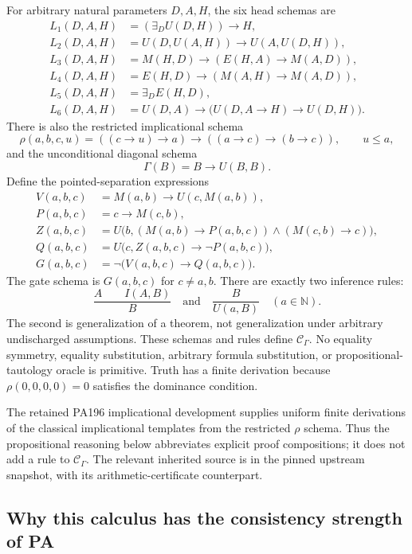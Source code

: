 For arbitrary natural parameters $D,A,H$, the six head schemas are
\begin{align*}
 L_1(D,A,H)&=(\exists_D U(D,H))\to H,\\
 L_2(D,A,H)&=U(D,U(A,H))\to U(A,U(D,H)),\\
 L_3(D,A,H)&=M(H,D)\to(E(H,A)\to M(A,D)),\\
 L_4(D,A,H)&=E(H,D)\to(M(A,H)\to M(A,D)),\\
 L_5(D,A,H)&=\exists_D E(H,D),\\
 L_6(D,A,H)&=U(D,A)\to\bigl(U(D,A\to H)\to U(D,H)\bigr).
\end{align*}
There is also the restricted implicational schema
\[
 \rho(a,b,c,u)=((c\to u)\to a)\to((a\to c)\to(b\to c)),
 \qquad u\le a,
\]
and the unconditional diagonal schema
\[
 \Gamma(B)=B\to U(B,B).
\]
Define the pointed-separation expressions
\begin{align*}
 V(a,b,c)&=M(a,b)\to U(c,M(a,b)),\\
 P(a,b,c)&=c\to M(c,b),\\
 Z(a,b,c)&=U\bigl(b,
     (M(a,b)\to P(a,b,c))\wedge(M(c,b)\to c)\bigr),\\
 Q(a,b,c)&=U\bigl(c,Z(a,b,c)\to\neg P(a,b,c)\bigr),\\
 G(a,b,c)&=\neg\bigl(V(a,b,c)\to Q(a,b,c)\bigr).
\end{align*}
The gate schema is $G(a,b,c)$ for $c\ne a,b$.  There are exactly two
inference rules:
\[
 \frac{A\qquad I(A,B)}{B}\quad\text{and}\quad
 \frac{B}{U(a,B)}\quad(a\in\mathbb N).
\]
The second is generalization of a theorem, not generalization under
arbitrary undischarged assumptions.  These schemas and rules define
$\mathcal C_\Gamma$.  No equality symmetry, equality substitution,
arbitrary formula substitution, or propositional-tautology oracle is
primitive.  Truth has a finite derivation because
$\rho(0,0,0,0)=0$ satisfies the dominance condition.

The retained PA196 implicational development supplies uniform finite
derivations of the classical implicational templates from the restricted
$\rho$ schema.  Thus the propositional reasoning below abbreviates
explicit proof compositions; it does not add a rule to
$\mathcal C_\Gamma$.  The relevant inherited source is
 in the pinned upstream snapshot,
with its arithmetic-certificate counterpart.

\subsection{Why this calculus has the consistency strength of PA}
\label{cal:logical}

